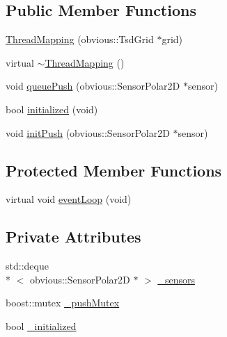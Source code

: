 \subsection*{Public Member Functions}
\begin{DoxyCompactItemize}
\item 
\hyperlink{classohm__tsd__slam__ref_1_1ThreadMapping_af5ba08d19538cdee50f17391084ba4c9}{Thread\-Mapping} (obvious\-::\-Tsd\-Grid $\ast$grid)
\item 
virtual \hyperlink{classohm__tsd__slam__ref_1_1ThreadMapping_afb1f328315a30d8066668af4f111ee40}{$\sim$\-Thread\-Mapping} ()
\item 
void \hyperlink{classohm__tsd__slam__ref_1_1ThreadMapping_aac36284866500920d4a23748be50aa2d}{queue\-Push} (obvious\-::\-Sensor\-Polar2\-D $\ast$sensor)
\item 
bool \hyperlink{classohm__tsd__slam__ref_1_1ThreadMapping_a28411f62f9383d0a533cee4cd270d81c}{initialized} (void)
\item 
void \hyperlink{classohm__tsd__slam__ref_1_1ThreadMapping_adb528149e6812dc8eba37ffe34801185}{init\-Push} (obvious\-::\-Sensor\-Polar2\-D $\ast$sensor)
\end{DoxyCompactItemize}
\subsection*{Protected Member Functions}
\begin{DoxyCompactItemize}
\item 
virtual void \hyperlink{classohm__tsd__slam__ref_1_1ThreadMapping_a4adf91a34a9cc1c237b180d02eb0b013}{event\-Loop} (void)
\end{DoxyCompactItemize}
\subsection*{Private Attributes}
\begin{DoxyCompactItemize}
\item 
std\-::deque\\*
$<$ obvious\-::\-Sensor\-Polar2\-D $\ast$ $>$ \hyperlink{classohm__tsd__slam__ref_1_1ThreadMapping_a789f75baff077164a69bb62b479c593d}{\-\_\-sensors}
\item 
boost\-::mutex \hyperlink{classohm__tsd__slam__ref_1_1ThreadMapping_a7c2899e1dd044dd21a98db7cf8b38a9d}{\-\_\-push\-Mutex}
\item 
bool \hyperlink{classohm__tsd__slam__ref_1_1ThreadMapping_a450952216cdda4e4a7b57d899429291c}{\-\_\-initialized}
\end{DoxyCompactItemize}
